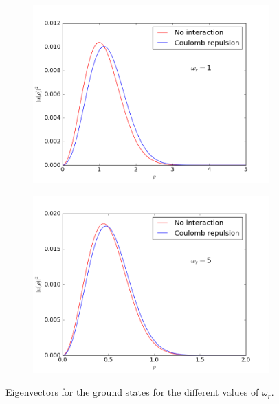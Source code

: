 \documentclass[12pt, a4paper]{article}
\begin{document}
\begin{figure}[ht!]
\begin{subfigure}[b]{0.495\textwidth}
  \end{subfigure}
  \begin{subfigure}[b]{0.495\textwidth}
		\includegraphics[width=\textwidth]{../Programs/Output/TwoParticle_Eigenvectors_omega1.png}
  \end{subfigure}
  \begin{subfigure}[b]{0.495\textwidth}
		\includegraphics[width=\textwidth]{../Programs/Output/TwoParticle_Eigenvectors_omega5.png}
  \end{subfigure}  
  \caption{Eigenvectors for the ground states for the different values of $\omega_r$. }
  \label{fig:eigenvectors_2p}
\end{figure}
\end{document}

